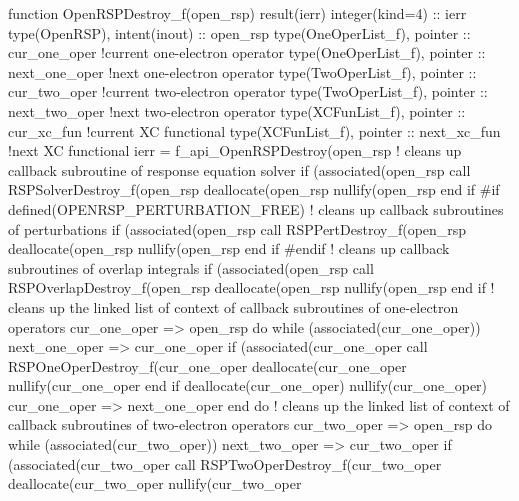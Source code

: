     function OpenRSPDestroy_f(open_rsp) result(ierr)
        integer(kind=4) :: ierr
        type(OpenRSP), intent(inout) :: open_rsp
        type(OneOperList_f), pointer :: cur_one_oper   !current one-electron operator
        type(OneOperList_f), pointer :: next_one_oper  !next one-electron operator
        type(TwoOperList_f), pointer :: cur_two_oper   !current two-electron operator
        type(TwoOperList_f), pointer :: next_two_oper  !next two-electron operator
        type(XCFunList_f), pointer :: cur_xc_fun       !current XC functional
        type(XCFunList_f), pointer :: next_xc_fun      !next XC functional
        ierr = f_api_OpenRSPDestroy(open_rsp%
        ! cleans up callback subroutine of response equation solver
        if (associated(open_rsp%
            call RSPSolverDestroy_f(open_rsp%
            deallocate(open_rsp%
            nullify(open_rsp%
        end if
#if defined(OPENRSP_PERTURBATION_FREE)
        ! cleans up callback subroutines of perturbations
        if (associated(open_rsp%
            call RSPPertDestroy_f(open_rsp%
            deallocate(open_rsp%
            nullify(open_rsp%
        end if
#endif
        ! cleans up callback subroutines of overlap integrals
        if (associated(open_rsp%
            call RSPOverlapDestroy_f(open_rsp%
            deallocate(open_rsp%
            nullify(open_rsp%
        end if
        ! cleans up the linked list of context of callback subroutines of one-electron operators
        cur_one_oper => open_rsp%
        do while (associated(cur_one_oper))
            next_one_oper => cur_one_oper%
            if (associated(cur_one_oper%
                call RSPOneOperDestroy_f(cur_one_oper%
                deallocate(cur_one_oper%
                nullify(cur_one_oper%
            end if
            deallocate(cur_one_oper)
            nullify(cur_one_oper)
            cur_one_oper => next_one_oper
        end do
        ! cleans up the linked list of context of callback subroutines of two-electron operators
        cur_two_oper => open_rsp%
        do while (associated(cur_two_oper))
            next_two_oper => cur_two_oper%
            if (associated(cur_two_oper%
                call RSPTwoOperDestroy_f(cur_two_oper%
                deallocate(cur_two_oper%
                nullify(cur_two_oper%
